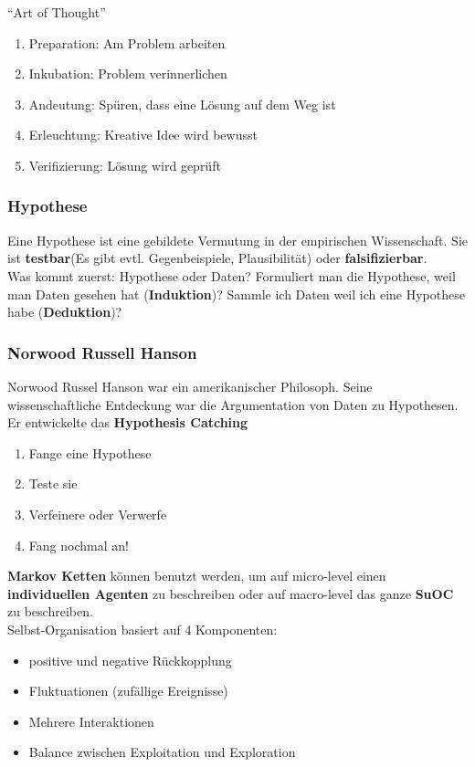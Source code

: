 \documentclass[a4paper]{article}
\begin{document}
``Art of Thought''
\begin{enumerate}
	\item Preparation: Am Problem arbeiten
	\item Inkubation: Problem verinnerlichen
	\item Andeutung: Spüren, dass eine Lösung auf dem Weg ist
	\item Erleuchtung: Kreative Idee wird bewusst
	\item Verifizierung: Lösung wird geprüft
\end{enumerate}

\subsubsection{Hypothese}
Eine Hypothese ist eine gebildete Vermutung in der empirischen Wissenschaft. Sie ist \textbf{testbar}(Es gibt evtl. Gegenbeispiele, Plausibilität) oder \textbf{falsifizierbar}.\\

Was kommt zuerst: Hypothese oder Daten? Formuliert man die Hypothese, weil man Daten gesehen hat (\textbf{Induktion})? Sammle ich Daten weil ich eine Hypothese habe (\textbf{Deduktion})?

\subsubsection{Norwood Russell Hanson}
Norwood Russel Hanson war ein amerikanischer Philosoph. Seine wissenschaftliche Entdeckung war die Argumentation von Daten zu Hypothesen. Er entwickelte das \textbf{Hypothesis Catching}
\begin{enumerate}
	\item Fange eine Hypothese
	\item Teste sie
	\item Verfeinere oder Verwerfe
	\item Fang nochmal an!
\end{enumerate}
\textbf{Markov Ketten} können benutzt werden, um auf micro-level einen \textbf{individuellen Agenten} zu beschreiben oder auf macro-level das ganze\textbf{ SuOC }zu beschreiben.\\

Selbst-Organisation basiert auf 4 Komponenten:
\begin{itemize}
	\item positive und negative Rückkopplung
	\item Fluktuationen (zufällige Ereignisse)
	\item Mehrere Interaktionen
	\item Balance zwischen Exploitation und Exploration
\end{itemize}
\end{document}
